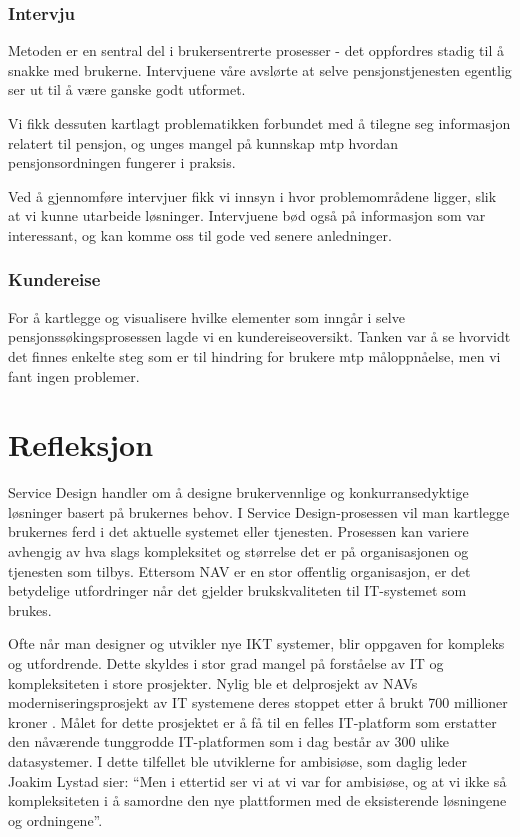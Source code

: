 \documentclass[informationsecurity]{gucmasterproject}
\begin{document}
\subsection{Intervju}
Metoden er en sentral del i brukersentrerte prosesser - det oppfordres stadig til å snakke med brukerne. Intervjuene våre avslørte at selve pensjonstjenesten egentlig ser ut til å være ganske godt utformet.

Vi fikk dessuten kartlagt problematikken forbundet med å tilegne seg informasjon relatert til pensjon, og unges mangel på kunnskap mtp hvordan pensjonsordningen fungerer i praksis.

Ved å gjennomføre intervjuer fikk vi innsyn i hvor problemområdene ligger, slik at vi kunne utarbeide løsninger. Intervjuene bød også på informasjon som var interessant, og kan komme oss til gode ved senere anledninger.

\subsection{Kundereise}
For å kartlegge og visualisere hvilke elementer som inngår i selve pensjonssøkingsprosessen lagde vi en kundereiseoversikt. Tanken var å se hvorvidt det finnes enkelte steg som er til hindring for brukere mtp måloppnåelse, men vi fant ingen problemer.



\chapter{Refleksjon}
Service Design handler om å designe brukervennlige og konkurransedyktige løsninger basert på brukernes behov. I Service Design-prosessen vil man kartlegge brukernes ferd i det aktuelle systemet eller tjenesten. Prosessen kan variere avhengig av hva slags kompleksitet og størrelse det er på organisasjonen og tjenesten som tilbys. Ettersom NAV er en stor offentlig organisasjon, er det betydelige utfordringer når det gjelder brukskvaliteten til IT-systemet som brukes.

Ofte når man designer og utvikler nye IKT systemer, blir oppgaven for kompleks og utfordrende. Dette skyldes i stor grad mangel på forståelse av IT og kompleksiteten i store prosjekter. Nylig ble et delprosjekt av NAVs moderniseringsprosjekt av IT systemene deres stoppet etter å brukt 700 millioner kroner \cite{stansetprosjekt}. Målet for dette prosjektet er å få til en felles IT-platform som erstatter den nåværende tunggrodde IT-platformen som i dag består av 300 ulike datasystemer. I dette tilfellet ble utviklerne for ambisiøse, som daglig leder Joakim Lystad sier: “Men i ettertid ser vi at vi var for ambisiøse, og at vi ikke så kompleksiteten i å samordne den nye plattformen med de eksisterende løsningene og ordningene”.
\end{document}
